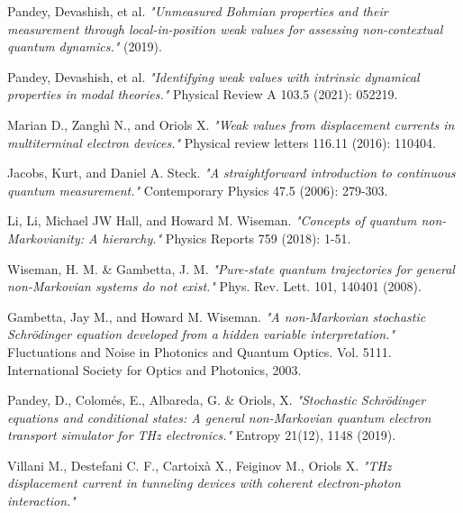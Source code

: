 \documentclass[11pt, a4paper]{article} %
\begin{document}
\begin{thebibliography}{1}
{
Pandey, Devashish, et al. {\em "Unmeasured Bohmian properties and their measurement through local-in-position weak values for assessing non-contextual quantum dynamics."} (2019).

Pandey, Devashish, et al. {\em "Identifying weak values with intrinsic dynamical properties in modal theories."} Physical Review A 103.5 (2021): 052219.

Marian D., Zanghì N., and Oriols X. {\em "Weak values from displacement currents in multiterminal electron devices."} Physical review letters 116.11 (2016): 110404.

Jacobs, Kurt, and Daniel A. Steck. {\em "A straightforward introduction to continuous quantum measurement."} Contemporary Physics 47.5 (2006): 279-303.

Li, Li, Michael JW Hall, and Howard M. Wiseman. {\em "Concepts of quantum non-Markovianity: A hierarchy."} Physics Reports 759 (2018): 1-51.

Wiseman, H. M. \& Gambetta, J. M. {\em "Pure-state quantum trajectories for general non-Markovian systems do not exist."} Phys. Rev. Lett. 101, 140401 (2008).

Gambetta, Jay M., and Howard M. Wiseman. {\em "A non-Markovian stochastic Schrödinger equation developed from a hidden variable interpretation."} Fluctuations and Noise in Photonics and Quantum Optics. Vol. 5111. International Society for Optics and Photonics, 2003.

Pandey, D., Colomés, E., Albareda, G. \& Oriols, X. {\em "Stochastic Schrödinger equations and conditional states: A general non-Markovian quantum electron transport simulator for THz electronics."} Entropy 21(12), 1148 (2019).

Villani M., Destefani C. F., Cartoixà X., Feiginov M., Oriols X. {\em "THz displacement current in tunneling devices with coherent electron-photon
interaction."}

}

\end{thebibliography}
\end{document}
